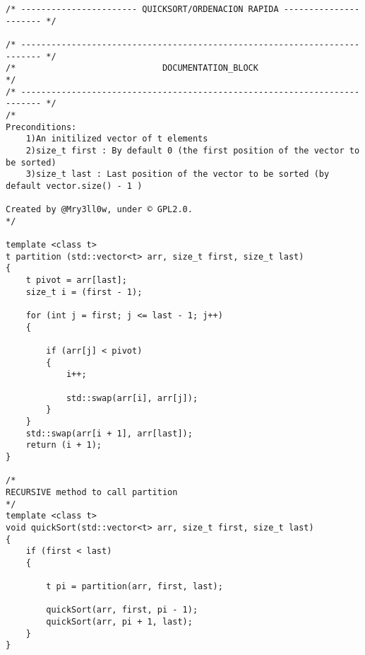 \begin{lstlisting}
/* ----------------------- QUICKSORT/ORDENACION RAPIDA ---------------------- */

/* -------------------------------------------------------------------------- */
/*                             DOCUMENTATION_BLOCK                            */
/* -------------------------------------------------------------------------- */
/*
Preconditions: 
    1)An initilized vector of t elements
    2)size_t first : By default 0 (the first position of the vector to be sorted)
    3)size_t last : Last position of the vector to be sorted (by default vector.size() - 1 )

Created by @Mry3ll0w, under © GPL2.0.
*/ 

template <class t>
t partition (std::vector<t> arr, size_t first, size_t last)  
{  
    t pivot = arr[last];  
    size_t i = (first - 1);  
  
    for (int j = first; j <= last - 1; j++)  
    {  
     
        if (arr[j] < pivot)  
        {  
            i++;  
    
            std::swap(arr[i], arr[j]);  
        }  
    }  
    std::swap(arr[i + 1], arr[last]);  
    return (i + 1);  
}  

/*
RECURSIVE method to call partition
*/
template <class t>
void quickSort(std::vector<t> arr, size_t first, size_t last)  
{  
    if (first < last)  
    {  
        
        t pi = partition(arr, first, last);  
   
        quickSort(arr, first, pi - 1);  
        quickSort(arr, pi + 1, last);  
    }  
}

\end{lstlisting}